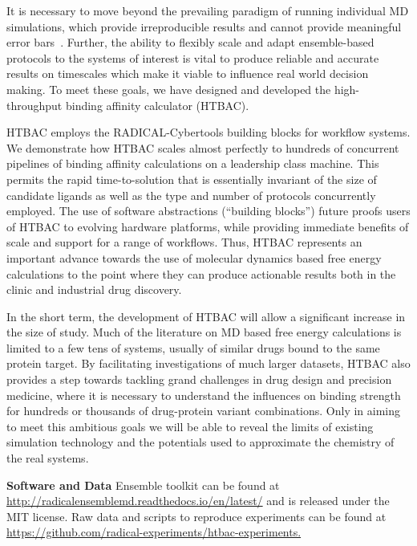 
It is necessary to move beyond the prevailing paradigm of running individual
MD simulations, which provide irreproducible results and cannot provide
meaningful error bars~\cite{Bhati2017}. Further, the ability to flexibly
scale and adapt ensemble-based protocols to the systems of interest is vital
to produce reliable and accurate results on timescales which make it viable
to influence real world decision making. To meet these goals, we have
designed and developed the high-throughput binding affinity calculator
(HTBAC).

HTBAC employs the RADICAL-Cybertools building blocks for workflow systems. We
demonstrate how HTBAC scales almost perfectly to hundreds of concurrent
pipelines of binding affinity calculations on a leadership class machine.
This permits the rapid time-to-solution that is essentially invariant of the
size of candidate ligands as well as the type and number of protocols
concurrently employed. The use of software abstractions (``building blocks'')
future proofs users of HTBAC to evolving hardware platforms, while providing
immediate benefits of scale and support for a range of workflows. Thus, HTBAC
represents an important advance towards the use of molecular dynamics based
free energy calculations to the point where they can produce actionable
results both in the clinic and industrial drug discovery.

In the short term, the development of HTBAC will allow a significant increase
in the size of study. Much of the literature on MD based free energy
calculations is limited to a few tens of systems, usually of similar drugs
bound to the same protein target. By facilitating investigations of much
larger datasets, HTBAC also provides a step towards tackling grand challenges
in drug design and precision medicine, where it is necessary to understand the
influences on binding strength for hundreds or thousands of drug-protein
variant combinations. Only in aiming to meet this ambitious goals we will be
able to reveal the limits of existing simulation technology and the
potentials used to approximate the chemistry of the real systems.

\footnotesize \textbf{Software and Data} Ensemble toolkit can be found at
\url{http://radicalensemblemd.readthedocs.io/en/latest/} and is released
under the MIT license. Raw data and scripts to reproduce experiments can be
found at \url{https://github.com/radical-experiments/htbac-experiments.}
